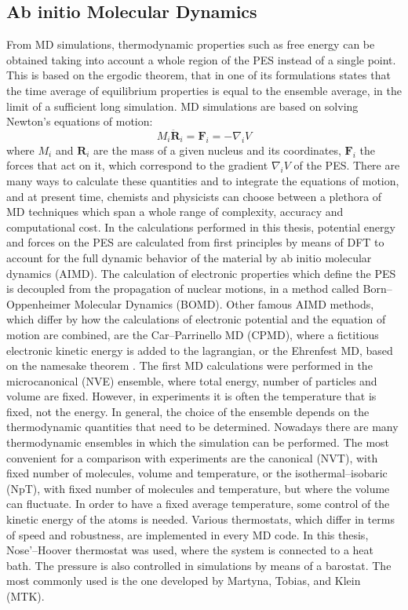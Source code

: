 \subsection*{Ab initio Molecular Dynamics}
From MD simulations, thermodynamic properties such as free energy can be obtained taking into account a whole region of the PES instead of a single point. This is based on the ergodic theorem, that in one of its formulations states that the time average of equilibrium properties is equal to the ensemble average, in the limit of a sufficient long simulation. 
\npar
MD simulations are based on solving Newton’s equations of motion:
\[
M_i \ddot{\mathbf{R}}_i = \mathbf{F}_i = - \nabla_i V
\]
where $M_i$ and $\mathbf{R}_i$ are the mass of a given nucleus and its coordinates, $\mathbf{F}_i$ the forces that act on it, which correspond to the gradient $\nabla_i V$ of the PES. There are many ways to calculate these quantities and to integrate the equations of motion, and at present time, chemists and physicists can choose between a plethora of MD techniques which span a whole range of complexity, accuracy and computational cost. 
In the calculations performed in this thesis, potential energy and forces on the PES are calculated from first principles by means of DFT to account for the full dynamic behavior of the material by ab initio molecular dynamics (AIMD). The calculation of electronic properties which define the PES is decoupled from the propagation of nuclear motions, in a method called Born--Oppenheimer Molecular Dynamics (BOMD). Other famous AIMD methods, which differ by how the calculations of electronic potential and the equation of motion are combined, are the Car--Parrinello MD (CPMD)\cite{Car1985}, where a fictitious electronic kinetic energy is added to the lagrangian, or the Ehrenfest MD, based on the namesake theorem \cite{Ehrenfest1927, Marx2009}. 
\npar
The first MD calculations were performed in the microcanonical (NVE) ensemble, where total energy, number of particles and volume are fixed. However, in experiments it is often the temperature that is fixed, not the energy. In general, the choice of the ensemble depends on the thermodynamic quantities that need to be determined. Nowadays there are many thermodynamic ensembles in which the simulation can be performed. The most convenient for a comparison with experiments are the canonical (NVT), with fixed number of molecules, volume and temperature, or the isothermal--isobaric (NpT), with fixed number of molecules and temperature, but where the volume can fluctuate. In order to have a fixed average temperature, some control of the kinetic energy of the atoms is needed. Various thermostats, which differ in terms of speed and robustness, are implemented in every MD code. In this thesis, Nose’--Hoover thermostat was used, where the system is connected to a heat bath. The pressure is also controlled in simulations by means of a barostat. The most commonly used is the one developed by Martyna, Tobias, and Klein (MTK)\cite{Martyna1994}.

